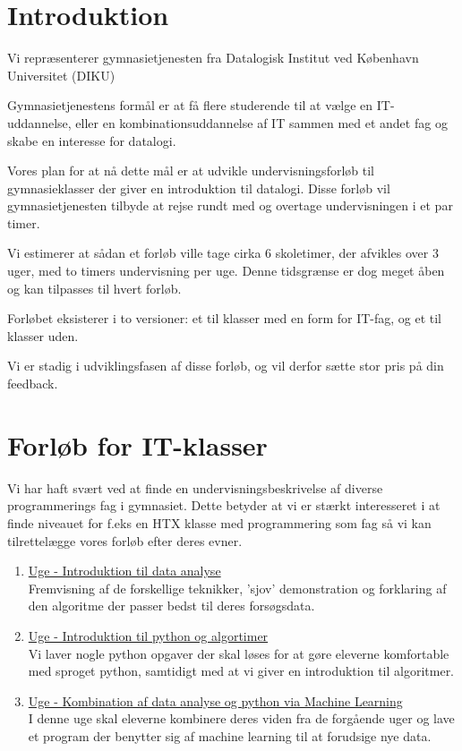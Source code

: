 \documentclass[11pt]{article}
\begin{document}
    \newpage                %
    \setcounter{page}{1}    %

\section{Introduktion}
    Vi repræsenterer gymnasietjenesten fra
    Datalogisk Institut ved København Universitet (DIKU)

    Gymnasietjenestens formål er at få flere studerende til at vælge en
    IT-uddannelse, eller en kombinationsuddannelse af IT sammen med et andet fag
    og skabe en interesse for datalogi.

    Vores plan for at nå dette mål er at udvikle undervisningsforløb til
    gymnasieklasser der giver en introduktion til datalogi. Disse forløb vil
    gymnasietjenesten tilbyde at rejse rundt med og overtage undervisningen i et
    par timer.

    Vi estimerer at sådan et forløb ville tage cirka 6 skoletimer, der afvikles
    over 3 uger, med to timers undervisning per uge. Denne tidsgrænse er dog
    meget åben og kan tilpasses til hvert forløb.

    Forløbet eksisterer i to versioner: et til klasser med en form for IT-fag,
    og et til klasser uden.

    Vi er stadig i udviklingsfasen af disse forløb, og vil derfor sætte stor
    pris på din feedback.

\section{Forløb for IT-klasser}
    Vi har haft svært ved at finde en undervisningsbeskrivelse af diverse
    programmerings fag i gymnasiet. Dette betyder at vi er stærkt interesseret i
    at finde niveauet for f.eks en HTX klasse med programmering som fag så vi
    kan tilrettelægge vores forløb efter deres evner.
    \begin{enumerate}
        \item \underline{Uge - Introduktion til data analyse} ~ \\
        Fremvisning af de forskellige teknikker, 'sjov' demonstration og
        forklaring af den algoritme der passer bedst til deres forsøgsdata.

        \item \underline{Uge - Introduktion til python og algortimer} ~ \\
        Vi laver nogle python opgaver der skal løses for at gøre eleverne
        komfortable med sproget python, samtidigt med at vi giver en
        introduktion til algoritmer.

        \item \underline{Uge - Kombination af data analyse og python via
        Machine Learning} ~ \\
        I denne uge skal eleverne kombinere deres viden fra de forgående uger
        og lave et program der benytter sig af machine learning til at forudsige
        nye data.
    \end{enumerate}
\end{document}
